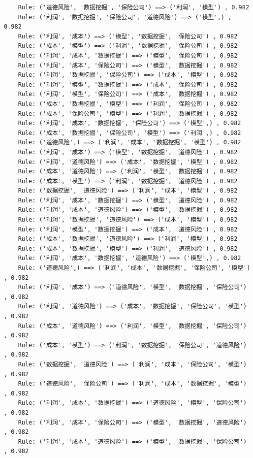 \documentclass[lang=cn,11pt,a4paper,cite=authoryear]{elegantpaper}
\begin{document}
\begin{lstlisting}
	Rule: ('道德风险', '数据挖掘', '保险公司') ==> ('利润', '模型') , 0.982
	Rule: ('利润', '数据挖掘', '保险公司', '道德风险') ==> ('模型',) , 0.982
	Rule: ('利润', '成本') ==> ('模型', '数据挖掘', '保险公司') , 0.982
	Rule: ('成本', '模型') ==> ('利润', '数据挖掘', '保险公司') , 0.982
	Rule: ('利润', '成本', '数据挖掘') ==> ('模型', '保险公司') , 0.982
	Rule: ('利润', '成本', '保险公司') ==> ('模型', '数据挖掘') , 0.982
	Rule: ('利润', '数据挖掘', '保险公司') ==> ('成本', '模型') , 0.982
	Rule: ('利润', '模型', '数据挖掘') ==> ('成本', '保险公司') , 0.982
	Rule: ('利润', '模型', '保险公司') ==> ('成本', '数据挖掘') , 0.982
	Rule: ('成本', '数据挖掘', '模型') ==> ('利润', '保险公司') , 0.982
	Rule: ('成本', '保险公司', '模型') ==> ('利润', '数据挖掘') , 0.982
	Rule: ('利润', '成本', '数据挖掘', '保险公司') ==> ('模型',) , 0.982
	Rule: ('成本', '数据挖掘', '保险公司', '模型') ==> ('利润',) , 0.982
	Rule: ('道德风险',) ==> ('利润', '成本', '数据挖掘', '模型') , 0.982
	Rule: ('利润', '成本') ==> ('模型', '数据挖掘', '道德风险') , 0.982
	Rule: ('利润', '道德风险') ==> ('成本', '数据挖掘', '模型') , 0.982
	Rule: ('成本', '道德风险') ==> ('利润', '模型', '数据挖掘') , 0.982
	Rule: ('成本', '模型') ==> ('利润', '数据挖掘', '道德风险') , 0.982
	Rule: ('数据挖掘', '道德风险') ==> ('利润', '成本', '模型') , 0.982
	Rule: ('利润', '成本', '数据挖掘') ==> ('模型', '道德风险') , 0.982
	Rule: ('利润', '成本', '道德风险') ==> ('模型', '数据挖掘') , 0.982
	Rule: ('利润', '数据挖掘', '道德风险') ==> ('成本', '模型') , 0.982
	Rule: ('利润', '模型', '数据挖掘') ==> ('成本', '道德风险') , 0.982
	Rule: ('成本', '数据挖掘', '道德风险') ==> ('利润', '模型') , 0.982
	Rule: ('成本', '数据挖掘', '模型') ==> ('利润', '道德风险') , 0.982
	Rule: ('利润', '成本', '数据挖掘', '道德风险') ==> ('模型',) , 0.982
	Rule: ('道德风险',) ==> ('利润', '成本', '数据挖掘', '保险公司', '模型') , 0.982
	Rule: ('利润', '成本') ==> ('道德风险', '模型', '数据挖掘', '保险公司') , 0.982
	Rule: ('利润', '道德风险') ==> ('成本', '数据挖掘', '保险公司', '模型') , 0.982
	Rule: ('成本', '道德风险') ==> ('利润', '模型', '数据挖掘', '保险公司') , 0.982
	Rule: ('成本', '模型') ==> ('利润', '数据挖掘', '保险公司', '道德风险') , 0.982
	Rule: ('数据挖掘', '道德风险') ==> ('利润', '成本', '保险公司', '模型') , 0.982
	Rule: ('道德风险', '保险公司') ==> ('利润', '成本', '数据挖掘', '模型') , 0.982
	Rule: ('利润', '成本', '数据挖掘') ==> ('道德风险', '模型', '保险公司') , 0.982
	Rule: ('利润', '成本', '保险公司') ==> ('模型', '数据挖掘', '道德风险') , 0.982
	Rule: ('利润', '成本', '道德风险') ==> ('模型', '数据挖掘', '保险公司') , 0.982

\end{lstlisting}
\end{document}

